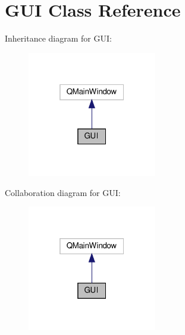 \hypertarget{classGUI}{}\section{G\+UI Class Reference}
\label{classGUI}


Inheritance diagram for G\+UI\+:
\nopagebreak
\begin{figure}[H]
\begin{center}
\leavevmode
\includegraphics[width=160pt]{classGUI__inherit__graph}
\end{center}
\end{figure}


Collaboration diagram for G\+UI\+:
\nopagebreak
\begin{figure}[H]
\begin{center}
\leavevmode
\includegraphics[width=160pt]{classGUI__coll__graph}
\end{center}
\end{figure}

